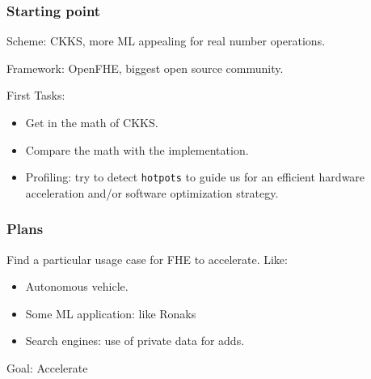 \documentclass[10pt,handout]{beamer}
\begin{document}


\begin{frame}
\frametitle{Starting point}
Scheme: CKKS, more ML appealing for real number operations.
\pause

Framework: OpenFHE, biggest open source community.
\pause

First Tasks:
\begin{itemize}
  \item Get in the math of CKKS.
  \item Compare the math with the implementation.\pause
  \item Profiling: try to detect \texttt{hotpots} to guide us for an efficient
    hardware acceleration and/or software optimization strategy.
\end{itemize}

\end{frame}




\begin{frame}
\frametitle{Plans}

Find a particular usage case for FHE to accelerate.
Like:
\begin{itemize}
  \item Autonomous vehicle.
  \item Some ML application: like Ronaks
  \item Search engines: use of private data for adds.
\end{itemize}

\begin{mdframed}[backgroundcolor=frenchblue!20]
  Goal: Accelerate
\end{mdframed}

\end{frame}


\end{document}
